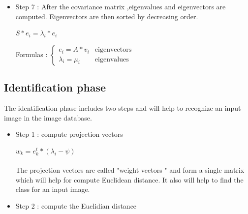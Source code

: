 \begin{itemize}
\item Step 7 : After the covariance matrix ,eigenvalues and eigenvectors are computed.
Eigenvectors are then sorted by decreasing order.

\begin{center}
\begin{math}
   S * e_{i} =  \lambda_{i} * e_{i}
\end{math}


Formulas :
 $ \left\{\begin{array}{rl}
e_{i}= A * v_{i} & \mbox{eigenvectors } \\
\lambda_{i} = \mu_{i} & \mbox{eigenvalues
}\end{array}\right.$


\end{center}
  \end{itemize}
  
\subsection{Identification phase}  
The identification phase includes two steps and will help to recognize an input image in the image database.
 \begin{itemize}
 \item Step 1 : compute projection vectors
 
\begin{math}
   w_{k} = e^t_{k} * (\lambda_{i} -\psi)
\end{math} 
 
 
 

\paragraph{}
The projection vectors are called "weight vectors " and form a single matrix which will help for  compute  Euclidean distance. It also will help to find the class for an  input image.
\item Step 2 : compute the Euclidian distance
 
 \end {itemize}

